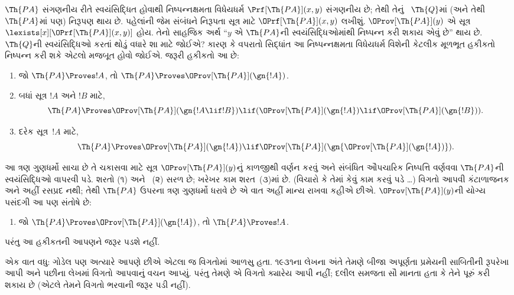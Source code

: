 $\Th{PA}$ સંગણનીય રીતે
સ્વયંસિદ્ધિત હોવાથી
નિષ્પન્નક્ષમતા વિધેયધર્મ
$\Prf[\Th{PA}](x,y)$
સંગણનીય છે; તેથી તેનું
~$\Th{Q}$માં (અને તેથી
~$\Th{PA}$માં પણ)
નિરૂપણ થાય છે. પહેલાંની
જેમ સંબંધને નિરૂપતા
સૂત્ર માટે
$\OPrf[\Th{PA}](x,y)$
લખીશું. $\OProv[\Th{PA}](y)$
એ સૂત્ર
$\lexists[x][\OPrf[\Th{PA}](x,y)]$
હોય. તેનો સાહજિક અર્થ
``$y$ એ $\Th{PA}$ની
સ્વયંસિદ્ધિઓમાંથી
નિષ્પન્ન કરી શકાય એવું છે'' થાય છે.
$\Th{Q}$ની સ્વયંસિદ્ધિઓ
કરતાં થોડું વધારે
શા માટે જોઈએ?
કારણ કે વપરાતો સિદ્ધાંત
આ નિષ્પન્નક્ષમતા
વિધેયધર્મ વિશેની કેટલીક
મૂળભૂત હકીકતો
નિષ્પન્ન કરી શકે એટલો
મજબૂત હોવો જોઈએ.
જરૂરી હકીકતો આ છે:
\begin{enumerate}
\item[P1.] જો
  $\Th{PA} \Proves !A$,
  તો $\Th{PA} \Proves
  \OProv[\Th{PA}](\gn{!A})$.
\item[P2.] બધાં
  સૂત્ર $!A$ અને
  $!B$ માટે,
  \[
  \Th{PA} \Proves \OProv[\Th{PA}](\gn{!A \lif !B}) \lif
  (\OProv[\Th{PA}](\gn{!A}) \lif \OProv[\Th{PA}](\gn{!B})).
  \]
\item[P3.] દરેક
  સૂત્ર~$!A$ માટે,
  \[
  \Th{PA} \Proves \OProv[\Th{PA}](\gn{!A})
  \lif \OProv[\Th{PA}](\gn{\OProv[\Th{PA}](\gn{!A})}).
  \]
\end{enumerate}
આ ત્રણ ગુણધર્મો સાચા
છે તે ચકાસવા માટે
સૂત્ર
$\OProv[\Th{PA}](y)$નું
કાળજીથી વર્ણન કરવું અને
સંબંધિત ઔપચારિક
નિષ્પત્તિ વર્ણવવા
$\Th{PA}$ની
સ્વયંસિદ્ધિઓ વાપરવી
પડે. શરતો (૧) અને
~(૨) સરળ છે; ખરેખર
કામ શરત~(૩)માં છે.
(વિચારો કે તેમાં કેવું
કામ કરવું પડે \dots)
વિગતો આપવી કંટાળાજનક
અને અહીં રસપ્રદ નથી;
તેથી $\Th{PA}$ ઉપરના
ત્રણ ગુણધર્મો ધરાવે છે
એ વાત અહીં માન્ય રાખવા
કહીએ છીએ. $\OProv[\Th{PA}](y)$ની
યોગ્ય પસંદગી આ પણ
સંતોષે છે:
\begin{enumerate}
\item[P4.] જો
  $\Th{PA} \Proves \OProv[\Th{PA}](\gn{!A})$,
  તો $\Th{PA} \Proves !A$.
\end{enumerate}
પરંતુ આ હકીકતની
આપણને જરૂર પડશે નહીં.

\begin{digress}
એક વાત વધુ: ગોડેલ પણ
અત્યારે આપણે છીએ એટલા
જ વિગતોમાં આળસુ હતા.
૧૯૩૧ના લેખના અંતે તેમણે
બીજા અપૂર્ણતા પ્રમેયની
સાબિતીની રૂપરેખા આપી
અને પછીના લેખમાં વિગતો
આપવાનું વચન આપ્યું.
પરંતુ તેમણે એ વિગતો
ક્યારેય આપી નહીં;
દલીલ સમજતા સૌ માનતા
હતા કે તેને પૂરું કરી
શકાય છે (એટલે તેમને
વિગતો ભરવાની જરૂર
પડી નહીં).
\end{digress}
\endgroup


